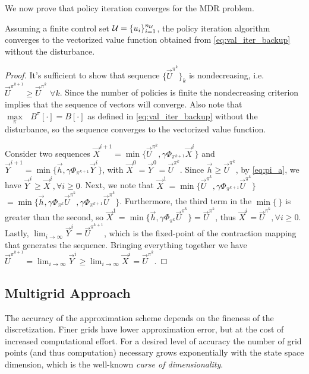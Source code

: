 We now prove that policy iteration converges for the MDR problem.
%
\begin{proposition}
Assuming a finite control set ${\mathcal{U}=\{u_i\}_{i=1}^{n_{\mathcal{U}}}}$, the policy iteration algorithm converges to the vectorized value function obtained from \eqref{eq:val_iter_backup} without the disturbance.
\end{proposition}%
\noindent \begin{proof}
It's sufficient to show that sequence ${\{ \vec{U}^{\pi^{k}}\}}_k$ is nondecreasing, i.e. $\vec{U}^{\pi^{k+1}} \geq \vec{U}^{\pi^k}$ $\forall k$. Since the number of policies is finite the nondecreasing criterion implies that the sequence of vectors will converge. Also note that $\underset{\pi}{\max}\text{ }B^{\pi}[\cdot] = B[\cdot]$ as defined in \eqref{eq:val_iter_backup} without the disturbance, so the sequence converges to the vectorized value function.

Consider two sequences ${\vec{X}^{i+1}=\min\big\{\vec{U}^{\pi^k}, \gamma \Phi_{\pi^{k+1}}\vec{X}^i \big\}}$ and ${\vec{Y}^{i+1}=\min\big\{\vec{h}, \gamma \Phi_{\pi^{k+1}} \vec{Y}^i \big\}}$, with ${\vec{X}^0=\vec{Y}^0=\vec{U}^{\pi^k}}$.
Since ${\vec{h}\geq \vec{U}^{\pi^k}}$, by \eqref{eq:pi_a}, we have ${\vec{Y}^i \geq \vec{X}^i,\forall i \geq 0}$.
Next, we note that ${\vec{X}^{1}=\min\big\{\vec{U}^{\pi^k},\gamma \Phi_{\pi^{k+1}}\vec{U}^{\pi^k}\big\}}$ ${=\min\big\{\vec{h}, \gamma \Phi_{\pi^{k}}\vec{U}^{\pi^k},\gamma \Phi_{\pi^{k+1}}\vec{U}^{\pi^k}\big\}}$.
Furthermore, the third term in the $\min\{\,\}$ is greater than the second, so $\vec{X}^{1}=\min\big\{\vec{h}, \gamma \Phi_{\pi^{k}}\vec{U}^{\pi^k} \big\} =  \vec{U}^{\pi^k}$, thus ${\vec{X}^{i} =  \vec{U}^{\pi^k},\forall i \geq 0}$.
Lastly, $\lim_{i\rightarrow \infty}\vec{Y}^i= \vec{U}^{\pi^{k+1}}$, which is the fixed-point of the contraction mapping that generates the sequence.
Bringing everything together we have $\vec{U}^{\pi^{k+1}} = \lim_{i\rightarrow \infty}\vec{Y}^i \geq   \lim_{i\rightarrow \infty}\vec{X}^i = \vec{U}^{\pi^{k}}.$
\end{proof}



\subsection{Multigrid Approach}

The accuracy of the approximation scheme depends on the fineness of the discretization. Finer grids have lower approximation error, but at the cost of increased computational effort. For a desired level of accuracy the number of grid points (and thus computation) necessary grows exponentially with the state space dimension, which is the well-known \emph{curse of dimensionality}. 

